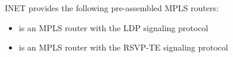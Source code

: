 INET provides the following pre-assembled MPLS routers:

\begin{itemize}
  \item {} is an MPLS router with the LDP signaling protocol
  \item {} is an MPLS router with the RSVP-TE signaling protocol
\end{itemize}



